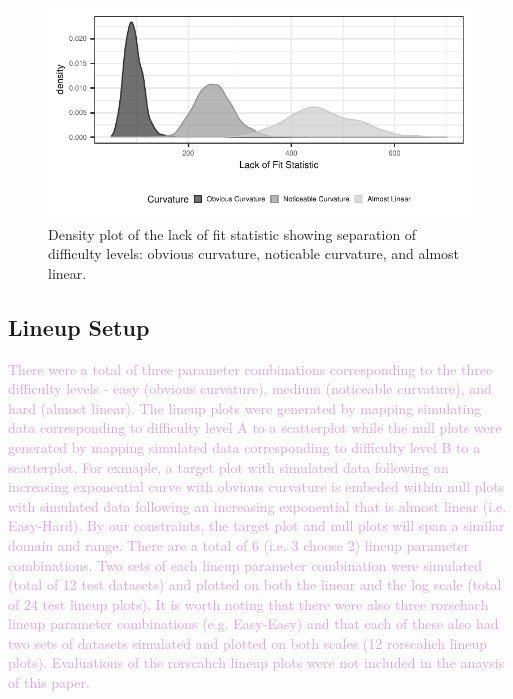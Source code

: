 \documentclass[]{interact}
\theoremstyle{plain}%
\theoremstyle{definition}
\theoremstyle{remark}
\begin{document}
\begin{figure}

{\centering \includegraphics{jsm-2021-student-paper-submission_files/figure-latex/lof-density-curves-1} 

}

\caption{Density plot of the lack of fit statistic showing separation of difficulty levels: obvious curvature, noticable curvature, and almost linear.}\label{fig:lof-density-curves}
\end{figure}

\hypertarget{lineup-setup}{%
\subsection{Lineup Setup}\label{lineup-setup}}

\textcolor{Plum}{There were a total of three parameter combinations corresponding to the three difficulty levels - easy (obvious curvature), medium (noticeable curvature), and hard (almost linear). 
The lineup plots were generated by mapping simulating data corresponding to difficulty level A to a scatterplot while the null plots were generated by mapping simulated data corresponding to difficulty level B to a scatterplot. 
For exmaple, a target plot with simulated data following an increasing exponential curve with obvious curvature is embeded within null plots with simulated data following an increasing exponential that is almost linear (i.e. Easy-Hard). 
By our constraints, the target plot and null plots will span a similar domain and range. 
There are a total of 6 (i.e. 3 choose 2) lineup parameter combinations.
Two sets of each lineup parameter combination were simulated (total of 12 test datasets) and plotted on both the linear and the log scale (total of 24 test lineup plots). 
It is worth noting that there were also three rorschach lineup parameter combinations (e.g. Easy-Easy) and that each of these also had two sets of datasets simulated and plotted on both scales (12 rorscahch lineup plots). Evaluations of the rorscahch lineup plots were not included in the anaysis of this paper.
}
\end{document}
